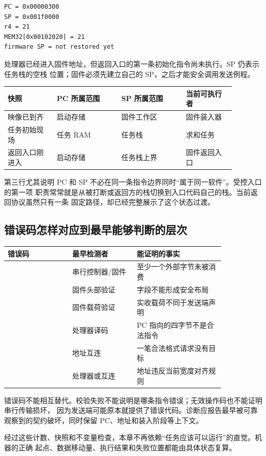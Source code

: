 \begin{lstlisting}
PC = 0x00000300
SP = 0x001f0000
r4 = 21
MEM32[0x00102020] = 21
firmware SP = not restored yet
\end{lstlisting}

处理器已经进入固件地址，但返回入口的第一条初始化指令尚未执行。SP 仍表示任务栈的空栈
位置；固件必须先建立自己的 SP，之后才能安全调用发送例程。

\begin{longtable}{|L{0.19\linewidth}|L{0.25\linewidth}|L{0.25\linewidth}|L{0.19\linewidth}|}
\hline
{}
快照 & PC 所属范围 & SP 所属范围 & 当前可执行者 \\ \hline
映像已到齐 & 启动存储 & 固件工作区 & 固件装入器 \\ \hline
任务初始现场 & 任务 RAM & 任务栈 & 求和任务 \\ \hline
返回入口刚进入 & 启动存储 & 任务栈上界 & 固件返回入口 \\ \hline
\end{longtable}

第三行尤其说明 PC 和 SP 不必在同一条指令边界同时“属于同一软件”。受控入口的第一项
职责常常就是从被打断或返回方的栈切换到入口代码自己的栈。当前返回协议虽然只有一条
固定路径，却已经完整展示了这个状态过渡。

\subsection{错误码怎样对应到最早能够判断的层次}

\begin{longtable}{|L{0.25\linewidth}|L{0.25\linewidth}|L{0.34\linewidth}|}
\hline
{}
错误码 & 最早检测者 & 能证明的事实 \\ \hline
{} & 串行控制器/固件 & 至少一个外部字节未被消费 \\ \hline
{} & 固件头部验证 & 字段不能形成安全布局 \\ \hline
{} & 固件载荷验证 & 实收载荷不同于发送端声明 \\ \hline
{} & 处理器译码 & PC 指向的四字节不是合法指令 \\ \hline
{} & 地址互连 & 一笔合法格式请求没有目标 \\ \hline
{} & 处理器或互连 & 地址违反当前宽度对齐规则 \\ \hline
\end{longtable}

错误码不能相互替代。校验失败不能说明是哪条指令错误；无效操作码也不能证明串行传输损坏，
因为发送端可能原本就提供了错误代码。诊断应报告最早被可靠观察到的契约破坏，同时保留
PC、地址和装入阶段等上下文。

经过这些计数、快照和不变量检查，本章不再依赖“任务应该可以运行”的直觉。机器的正确
起点、数据移动量、执行结果和失败位置都能由具体状态复算。
